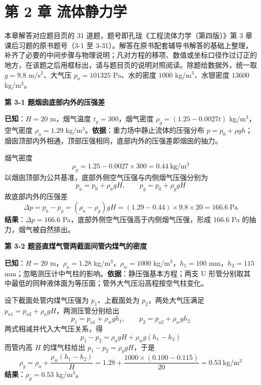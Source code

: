 \chapter*{第 2 章 流体静力学}


\begin{tishi}
本章解答对应题目页的 31 道题，题号即孔珑《工程流体力学（第四版）》第 3 章课后习题的原书题号（3-1 至 3-31）。解答在原书配套辅导书解答的基础上整理，补齐了必要的中间步骤与物理说明；凡对方程的移项、数值或坐标口径作过订正的地方，在该题之后用框标出，请与题目页的说明对照阅读。除题给数据外，统一取 $g=9.8$ m/s$^2$、大气压 $p_a=101325$ Pa、水的密度 $1000$ kg/m$^3$、水银密度 $13600$ kg/m$^3$。
\end{tishi}

\noindent\textbf{第 3-1 题\quad 烟囱底部内外的压强差}

\begin{jie}
\textbf{已知}：$H=20$ m，烟气温度 $t_g=300$，烟气密度 $\rho_g=(1.25-0.0027t)$ kg/m$^3$，空气密度 $\rho_a=1.29$ kg/m$^3$。\textbf{依据}：重力场中静止流体的压强分布 $p=p_0+\rho gh$；烟囱顶部内外相通，顶部压强相同，底部内外的压强差即烟囱的抽力。

烟气密度
\[ \rho_g=1.25-0.0027\times300=0.44\ \mathrm{kg/m^3} \]
以烟囱顶部为公共基准，底部外侧空气压强与内侧烟气压强分别为
\[ p_{a}=p_0+\rho_a gH,\qquad p_{g}=p_0+\rho_g gH \]
故底部内外的压强差
\[ \Delta p=p_a-p_g=(\rho_a-\rho_g)gH=(1.29-0.44)\times9.8\times20=166.6\ \mathrm{Pa} \]
\textbf{结果}：$\Delta p=166.6$ Pa，底部外侧空气压强高于内侧烟气压强，形成 166.6 Pa 的抽力，烟气被自然排出。
\end{jie}

\noindent\textbf{第 3-2 题\quad 竖直煤气管两截面间管内煤气的密度}

\begin{jie}
\textbf{已知}：$H=20$ m，$\rho_a=1.28$ kg/m$^3$，$\rho_w=1000$ kg/m$^3$，$h_1=100$ mm，$h_2=115$ mm；忽略测压计中气柱的影响。\textbf{依据}：静压强基本方程；两支 U 形管分别取其中最低的同种液体面为等压面；管外大气压沿高程按空气柱变化。

设下截面处管内煤气压强为 $p_1$、上截面处为 $p_2$，两处大气压满足 $p_{a1}=p_{a2}+\rho_a gH$，两测压管分别给出
\[ p_1=p_{a1}+\rho_w gh_1,\qquad p_2=p_{a2}+\rho_w gh_2 \]
两式相减并代入大气压关系，得
\[ p_1-p_2=\rho_a gH+\rho_w g(h_1-h_2) \]
而管内高 $H$ 的煤气柱给出 $p_1-p_2=\rho_g gH$，于是
\[ \rho_g=\rho_a+\frac{\rho_w(h_1-h_2)}{H}=1.28+\frac{1000\times(0.100-0.115)}{20}=0.53\ \mathrm{kg/m^3} \]
\textbf{结果}：$\rho_g=0.53$ kg/m$^3$。
\end{jie}

